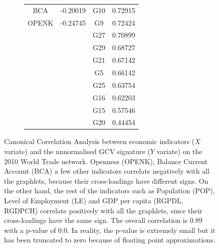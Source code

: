 \begin{figure}[H]
\begin{subfigure}{.7\textwidth}
\begin{tabular}{ c c | c c }
  BCA & -0.20019 &  G10 & 0.72915\\
  OPENK & -0.24745 &  G9 & 0.72424\\
  & &  G27 & 0.70899\\
  & &  G29 & 0.68727\\
  & &  G21 & 0.67142\\
  & &  G5 & 0.66142\\
  & &  G25 & 0.63754\\
  & &  G16 & 0.62203\\
  & &  G15 & 0.57546\\
  & &  G20 & 0.44454\\
  \end{tabular}
  \end{subfigure}
  \begin{subfigure}{.25\textwidth}
    \centering 
    
    \gone
    \gtwo
    \gsix
    \gdots
    \gsixteen
    \gfifteen
    \gtwenty
    
  \end{subfigure}
  
  \caption[CCA - World Trade Network - unnormalised GCV]{Canonical Correlation Analysis between economic indicators ($X$ variate) and the unnormalised GCV signature ($Y$ variate) on the 2010 World Trade network. Openness (OPENK), Balance Current Account (BCA) a few other indicators correlate negatively with all the graphlets, because their cross-loadings have different signs. On the other hand, the rest of the indicators such as Population (POP), Level of Employment (LE) and GDP per capita (RGPDL, RGDPCH) correlate positively with all the graphlets, since their cross-loadings have the same sign. The overall correlation is 0.89 with a p-value of 0.0. In reality, the p-value is extremely small but it has been truncated to zero because of floating point approximations.}
  \label{all_trade_thresh_cca_orig}
\end{figure}




